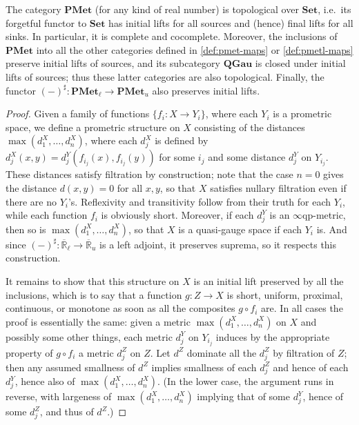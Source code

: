 \documentclass{article}
\def\R{\mathbb{R}}
\def\Re{\overline{\R}}
\def\Reu{\Re_u}
\def\Rel{\Re_{\ell}}
\def\upp#1{{#1}^{\sharp}}
\def\eqp{$\infty$qp}
\def\Set{\mathbf{Set}}
\def\PMet{\mathbf{PMet}}
\def\QGau{\mathbf{QGau}}
\def\PMetu{\mathbf{PMet}_u}
\def\PMetl{\mathbf{PMet}_\ell}
\begin{document}
\begin{thm}\label{thm:pmet-topconcrete}
  The category $\PMet$ (for any kind of real number) is topological over $\Set$, i.e.\ its forgetful functor to $\Set$ has initial lifts for all sources and (hence) final lifts for all sinks.
  In particular, it is complete and cocomplete.
  Moreover, the inclusions of $\PMet$ into all the other categories defined in \cref{def:pmet-maps} or \cref{def:pmetl-maps} preserve initial lifts of sources, and its subcategory $\QGau$ is closed under initial lifts of sources; thus these latter categories are also topological.
  Finally, the functor $\upp{(-)} : \PMetl \to\PMetu$ also preserves initial lifts.
\end{thm}
\begin{proof}
  Given a family of functions $\{f_i : X \to Y_i\}$, where each $Y_i$ is a prometric space, we define a prometric structure on $X$ consisting of the distances $\max(d^X_1,\dots,d^X_n)$, where each $d^X_j$ is defined by $d^X_j(x,y) = d_j^Y(f_{i_j}(x),f_{i_j}(y))$ for some $i_j$ and some distance $d_j^Y$ on $Y_{i_j}$.
  These distances satisfy filtration by construction; note that the case $n=0$ gives the distance $d(x,y)=0$ for all $x,y$, so that $X$ satisfies nullary filtration even if there are no $Y_i$'s.
  Reflexivity and transitivity follow from their truth for each $Y_i$, while each function $f_i$ is obviously short.
  Moreover, if each $d_j^Y$ is an \eqp-metric, then so is $\max(d^X_1,\dots,d^X_n)$, so that $X$ is a quasi-gauge space if each $Y_i$ is.
  And since $\upp{(-)}:\Rel \to \Reu$ is a left adjoint, it preserves suprema, so it respects this construction.

  It remains to show that this structure on $X$ is an initial lift preserved by all the inclusions, which is to say that a function $g:Z\to X$ is short, uniform, proximal, continuous, or monotone as soon as all the composites $g\circ f_i$ are.
  In all cases the proof is essentially the same: given a metric $\max(d^X_1,\dots,d^X_n)$ on $X$ and possibly some other things, each metric $d_j^Y$ on $Y_{i_j}$ induces by the appropriate property of $g\circ f_i$ a metric $d^Z_j$ on $Z$.
  Let $d^Z$ dominate all the $d^Z_j$ by filtration of $Z$; then any assumed smallness of $d^Z$ implies smallness of each $d^Z_j$ and hence of each $d_j^Y$, hence also of $\max(d^X_1,\dots,d^X_n)$.
  (In the lower case, the argument runs in reverse, with largeness of $\max(d^X_1,\dots,d^X_n)$ implying that of some $d_j^Y$, hence of some $d^Z_j$, and thus of $d^Z$.)
\end{proof}
\end{document}
